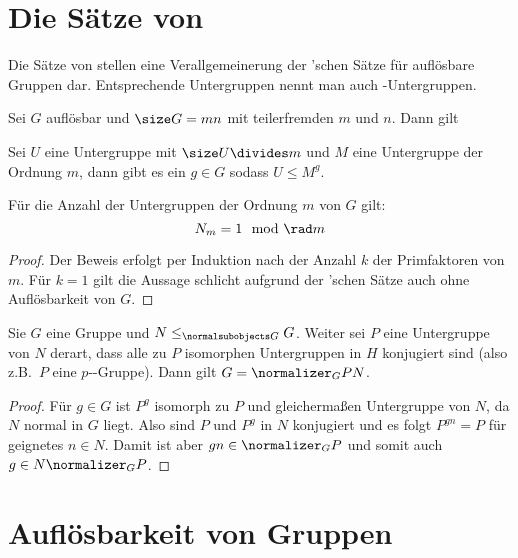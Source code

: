\section{Die Sätze von }%

Die Sätze von  stellen eine Verallgemeinerung der 'schen Sätze für auflösbare Gruppen dar. Entsprechende
Untergruppen nennt man auch -Untergruppen.

\begin{theorem}
    Sei $G$ auflösbar und $\size G = mn$ mit teilerfremden $m$ und $n$. Dann gilt
    \begin{statements}
        \item Sei $U$ eine Untergruppe mit $\size U \divides m$ und $M$ eine Untergruppe der Ordnung $m$, dann gibt es ein $g\in G$
    sodass $U\leq M^g$.
        \item Für die Anzahl der Untergruppen der Ordnung $m$ von $G$ gilt:
    $$
    N_m = 1 \mod \rad m
    $$
    \end{statements}
\end{theorem}

\begin{proof}
    Der Beweis erfolgt per Induktion nach der Anzahl $k$ der Primfaktoren von $m$. Für $k=1$ gilt die Aussage schlicht aufgrund der
    'schen Sätze auch ohne Auflösbarkeit von $G$.
    
\end{proof}

\begin{theorem}
    Sie $G$ eine Gruppe und $N\leq_{\normalsubobjects G} G$. Weiter sei $P$ eine Untergruppe von $N$ derart, dass alle zu $P$ isomorphen
    Untergruppen in $H$ konjugiert sind (also z.B.~$P$ eine $p$--Gruppe). Dann gilt
    $G = \normalizer_G P N$.
\end{theorem}

\begin{proof}
    Für $g\in G$ ist $P^g$ isomorph zu $P$ und gleichermaßen Untergruppe von $N$, da $N$ normal in $G$ liegt. Also sind $P$ und $P^g$ in $N$
    konjugiert und es folgt $P^{gn}=P$ für geignetes $n\in N$. Damit ist aber $gn\in \normalizer_G P$ und somit auch $g\in N
    \normalizer_G P$.
\end{proof}

\section{Auflösbarkeit von Gruppen}

